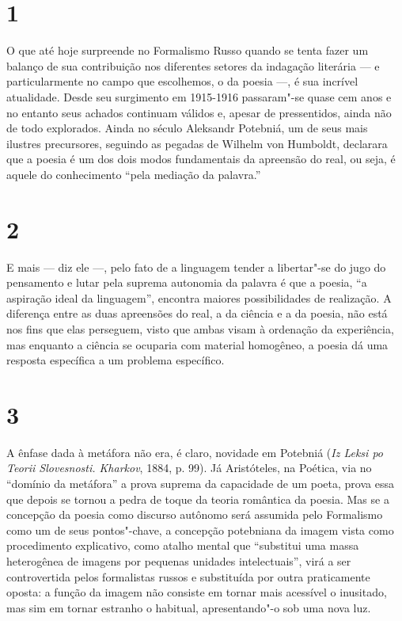 

\section{1}

O que até hoje surpreende no Formalismo Russo quando se tenta fazer um
balanço de sua contribuição nos diferentes setores da indagação
literária --- e particularmente no campo que escolhemos, o da poesia ---,
é sua incrível atualidade. Desde seu surgimento em 1915-1916 passaram"-se
quase cem anos e no entanto seus achados continuam válidos e, apesar de
pressentidos, ainda não de todo explorados. Ainda no século  Aleksandr
Potebniá, um de seus mais ilustres precursores, seguindo as pegadas de
Wilhelm von Humboldt, declarara que a poesia é um dos dois modos
fundamentais da apreensão do real, ou seja, é aquele do conhecimento
``pela mediação da palavra.''

\section{2}

E mais --- diz ele ---, pelo fato de a linguagem tender a libertar"-se do
jugo do pensamento e lutar pela suprema autonomia da palavra é que a
poesia, ``a aspiração ideal da linguagem'', encontra maiores
possibilidades de realização. A diferença entre as duas apreensões do
real, a da ciência e a da poesia, não está nos fins que elas perseguem,
visto que ambas visam à ordenação da experiência, mas enquanto a ciência
se ocuparia com material homogêneo, a poesia dá uma resposta específica
a um problema específico.

\section{3}

A ênfase dada à metáfora não era, é claro, novidade em Potebniá
(\emph{Iz Leksi po Teorii Slovesnosti. Kharkov}, 1884, p. 99). Já
Aristóteles, na Poética, via no ``domínio da metáfora'' a prova suprema
da capacidade de um poeta, prova essa que depois se tornou a pedra de
toque da teoria romântica da poesia. Mas se a concepção da poesia como
discurso autônomo será assumida pelo Formalismo como um de seus
pontos"-chave, a concepção potebniana da imagem vista como procedimento
explicativo, como atalho mental que ``substitui uma massa heterogênea de
imagens por pequenas unidades intelectuais'', virá a ser controvertida
pelos formalistas russos e substituída por outra praticamente oposta: a
função da imagem não consiste em tornar mais acessível o inusitado, mas
sim em tornar estranho o habitual, apresentando"-o sob uma nova luz.

